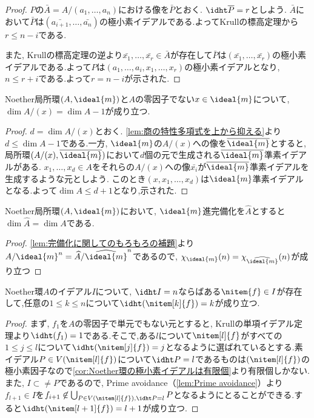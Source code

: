 \begin{proof}
	$P$の$\bar{A}=A/(a_1,\dots,a_n)$における像を$\bar{P}$とおく. $\idht \bar{P}=r$としよう. $\bar{A}$において$\bar{P}$は$(\bar{a_{i+1}},\dots,\bar{a_n})$の極小素イデアルである.よってKrullの標高定理から$r\leq n-i$である.
	
	また, Krullの標高定理の逆より$\bar{x_1},\dots,\bar{x_r}\in\bar{A}$が存在して$\bar{P}$は$(\bar{x_1},\dots,\bar{x_r})$の極小素イデアルである.よって$P$は$(a_1,\dots,a_i,x_1,\dots,x_r)$の極小素イデアルとなり, $n\leq r+i$である.よって$r=n-i$が示された.
\end{proof}

\begin{prop}
	Noether局所環$(A,\ideal{m})$と$A$の零因子でない$x\in\ideal{m}$について, $\dim A/(x)=\dim A-1$が成り立つ.
\end{prop}

\begin{proof}
	$d=\dim A/(x)$とおく. \ref{lem:商の特性多項式を上から抑える}より$d\leq \dim A-1$である.一方, $\ideal{m}$の$A/(x)$への像を$\bar{\ideal{m}}$とすると,局所環$(A/(x),\bar{\ideal{m}})$において$d$個の元で生成される$\bar{\ideal{m}}$準素イデアルがある. $x_1,\dots,x_d\in A$をそれらの$A/(x)$への像$\bar{x_i}$が$\bar{\ideal{m}}$準素イデアルを生成するような元としよう. このとき$(x,x_1,\dots,x_d)$は$\ideal{m}$準素イデアルとなる.よって$\dim A\leq d+1$となり,示された.
\end{proof}

\begin{thm}\label{thm:完備化は次元を保つ}
	Noether局所環$(A,\ideal{m})$において, $\ideal{m}$進完備化を$\widehat{A}$とすると$\dim\widehat{A}=\dim A$である.
\end{thm}

\begin{proof}
	\ref{lem:完備化に関してのもろもろの補題}より$A/\ideal{m}^n=\widehat{A}/{\widehat{\ideal{m}}}^n$であるので, $\chi_{\ideal{m}}(n)=\chi_{\widehat{\ideal{m}}}(n)$が成り立つ
\end{proof}

\begin{prop}
	Noether環$A$のイデアル$I$について, $\idht I=n$ならばある$\nitem{f}\in I$が存在して,任意の$1\leq k\leq n$について$\idht (\nitem[k]{f})=k$が成り立つ.
\end{prop}

\begin{proof}
	まず, $f_1$を$A$の零因子で単元でもない元とすると, Krullの単項イデアル定理より$\idht (f_1)=1$である.そこで,ある$l$について$\nitem[l]{f}$がすべての$1\leq j\leq l$について$\idht (\nitem[j]{f})=j$となるように選ばれているとする.素イデアル$P\in V(\nitem[l]{f})$について$\idht P=l$であるものは$(\nitem[l]{f})$の極小素因子なので\ref{cor:Noether環の極小素イデアルは有限個}より有限個しかない.また, $I\subset\neq P$であるので, Prime avoidance（\ref{lem:Prime avoidance}）より$f_{l+1}\in I$を$f_{i+1}\not\in\bigcup_{P\in V(\nitem[l]{f}),\idht P=l} P$となるようにとることができる.すると$\idht (\nitem[l+1]{f})=l+1$が成り立つ.
\end{proof}

